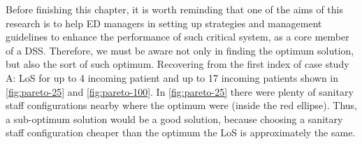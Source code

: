 Before finishing this chapter, it is worth reminding that one of the
aims of this research is to help ED managers in setting up strategies
and management guidelines to enhance the performance of such critical
system, as a core member of a DSS. Therefore, we must be aware not
only in finding the optimum solution, but also the sort of such optimum.
Recovering from the first index of case study A: LoS for up to 4 incoming
patient and up to 17 incoming patients shown in \ref{fig:pareto-25}
and \ref{fig:pareto-100}. In \ref{fig:pareto-25} there were plenty
of sanitary staff configurations nearby where the optimum were (inside
the red ellipse). Thus, a sub-optimum solution would be a good solution,
because choosing a sanitary staff configuration cheaper than the optimum
the LoS is approximately the same.

